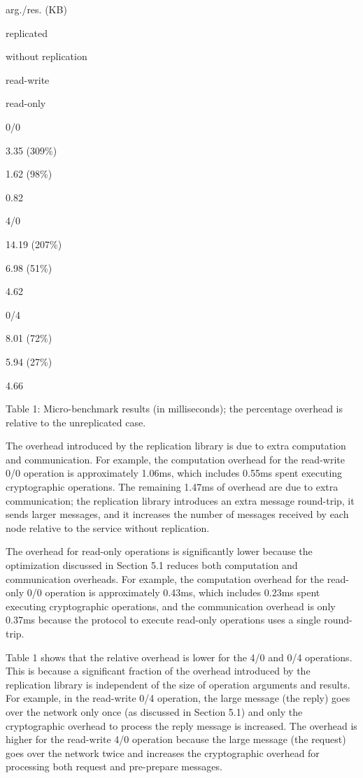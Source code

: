 \documentclass[
]{article}
\begin{document}
arg./res. (KB)

replicated

without replication

read-write

read-only

0/0

3.35 (309\%)

1.62 (98\%)

0.82

4/0

14.19 (207\%)

6.98 (51\%)

4.62

0/4

8.01 (72\%)

5.94 (27\%)

4.66

Table 1: Micro-benchmark results (in milliseconds); the percentage
overhead is relative to the unreplicated case.

The overhead introduced by the replication library is due to extra
computation and communication. For example, the computation overhead for
the read-write 0/0 operation is approximately 1.06ms, which includes
0.55ms spent executing cryptographic operations. The remaining 1.47ms of
overhead are due to extra communication; the replication library
introduces an extra message round-trip, it sends larger messages, and it
increases the number of messages received by each node relative to the
service without replication.

The overhead for read-only operations is significantly lower because the
optimization discussed in Section 5.1 reduces both computation and
communication overheads. For example, the computation overhead for the
read-only 0/0 operation is approximately 0.43ms, which includes 0.23ms
spent executing cryptographic operations, and the communication overhead
is only 0.37ms because the protocol to execute read-only operations uses
a single round-trip.

Table 1 shows that the relative overhead is lower for the 4/0 and 0/4
operations. This is because a significant fraction of the overhead
introduced by the replication library is independent of the size of
operation arguments and results. For example, in the read-write 0/4
operation, the large message (the reply) goes over the network only once
(as discussed in Section 5.1) and only the cryptographic overhead to
process the reply message is increased. The overhead is higher for the
read-write 4/0 operation because the large message (the request) goes
over the network twice and increases the cryptographic overhead for
processing both request and pre-prepare messages.
\end{document}
